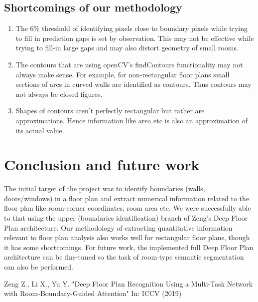 \documentclass[a4paper]{article}
\begin{document}
\subsection{Shortcomings of our methodology}
\begin{enumerate}
    \item The 6\% threshold of identifying pixels close to boundary pixels while trying to fill in prediction gaps is set by observation. This may not be effective while trying to fill-in large gaps and may also distort geometry of small rooms.
    \item The contours that are using openCV's findContours functionality may not always make sense. For example, for non-rectangular floor plans small sections of arcs in curved walls are identified as contours. Thus contours may not always be closed figures.
    \item Shapes of contours aren't perfectly rectangular but rather are approximations. Hence information like area etc is also an approximation of its actual value. 
\end{enumerate}


\section{Conclusion and future work}
The initial target of the project was to identify boundaries (walls, doors/windows) in a floor plan and extract numerical information related to the floor plan like room-corner coordinates, room area etc. We were successfully able to that using the upper (boundaries identification) branch of Zeng's Deep Floor Plan architecture. Our methodology of extracting quantitative information relevant to floor plan analysis also works well for rectangular floor plans, though it has some shortcomings. 
For future work, the implemented full Deep Floor Plan architecture can be fine-tuned so the task of room-type semantic segmentation can also be performed. 



\begin{thebibliography}{99}
 Zeng Z., Li X., Yu Y. "Deep Floor Plan Recognition Using a Multi-Task Network with Room-Boundary-Guided Attention" In: ICCV (2019)
\end{thebibliography}
\end{document}
